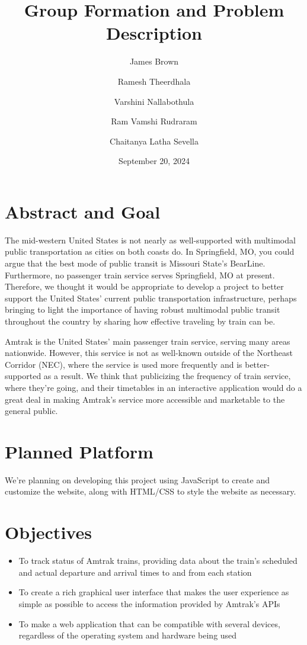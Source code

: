 \documentclass[letterpaper, 11pt, DIV = 10]{scrartcl}
\title{Group Formation and Problem Description}
\author{James Brown\and Ramesh Theerdhala\and Varshini Nallabothula\and Ram Vamshi Rudraram\and Chaitanya Latha Sevella}
\date{September 20, 2024}
\begin{document}
	\begin{titlepage}
		\maketitle
	\end{titlepage}
	
	\section*{Abstract and Goal}
		The mid-western United States is not nearly as well-supported with multimodal public transportation as cities on both coasts do. In Springfield, MO, you could argue that the best mode of public transit is Missouri State's BearLine. Furthermore, no passenger train service serves Springfield, MO at present. Therefore, we thought it would be appropriate to develop a project to better support the United States' current public transportation infrastructure, perhaps bringing to light the importance of having robust multimodal public transit throughout the country by sharing how effective traveling by train can be.
		
		Amtrak is the United States' main passenger train service, serving many areas nationwide. However, this service is not as well-known outside of the Northeast Corridor (NEC), where the service is used more frequently and is better-supported as a result. We think that publicizing the frequency of train service, where they're going, and their timetables in an interactive application would do a great deal in making Amtrak's service more accessible and marketable to the general public. %
		
	\section*{Planned Platform}
		We're planning on developing this project using JavaScript to create and customize the website, along with HTML/CSS to style the website as necessary.
		
	\section*{Objectives}
		\begin{itemize}
			\item To track status of Amtrak trains, providing data about the train's scheduled and actual departure and arrival times to and from each station
			\item To create a rich graphical user interface that makes the user experience as simple as possible to access the information provided by Amtrak's APIs
			\item To make a web application that can be compatible with several devices, regardless of the operating system and hardware being used
		\end{itemize}
		
		
\end{document}
